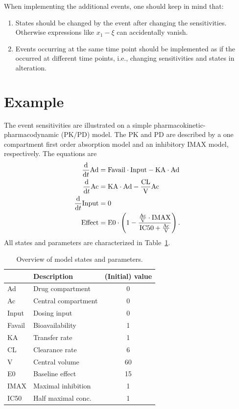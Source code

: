 \documentclass[journal, a4paper]{IEEEtran}
\begin{document}
When implementing the additional events, one should keep in mind that:
\begin{enumerate}
	\item States should be changed by the event after changing the sensitivities. Otherwise expressions like $x_1 - \xi$ can accidentally vanish.
	\item Events occurring at the same time point should be implemented as if the occurred at different time points, i.e., changing sensitivities and states in alteration.
\end{enumerate}


\section{Example}

The event sensitivities are illustrated on a simple pharmacokinetic-pharmacodynamic (PK/PD) model. The PK and PD are described by a one compartment first order absorption model and an inhibitory IMAX model, respectively. The equations are
\begin{align}
  \frac{\rm d}{{\rm d}t}{\rm Ad} &= {\rm Favail}\cdot{\rm Input}-{\rm KA}\cdot{\rm Ad} \label{eq:ODE_1} \\
  \frac{\rm d}{{\rm d}t}{\rm Ac} &= {\rm KA}\cdot{\rm Ad}-\frac{\rm CL}{\rm V}{\rm Ac}\\
  \frac{\rm d}{{\rm d}t}{\rm Input} &= 0 \label{eq:ODE_3} \\
  {\rm Effect} &= {\rm E0}\cdot\left(1-\frac{\frac{\rm Ac}{\rm V}\cdot{\rm IMAX}}{{\rm IC50}+\frac{\rm Ac}{\rm V}}\right).\label{eq:effect}
\end{align}
All states and parameters are characterized in Table~\ref{tab:parameters}.
\begin{table}[hb]
    \caption{Overview of model states and parameters.}
    \centering
    \begin{tabular}{l|l|c}
           & Description & (Initial) value \\
           \hline\hline
        Ad & Drug compartment & 0 \\
        Ac & Central compartment & 0\\
        Input & Dosing input & 0\\
        \hline
        Favail & Bioavailability & 1\\
        KA & Transfer rate & 1\\
        CL & Clearance rate & 6\\
        V & Central volume & 60\\
        E0 & Baseline effect & 15\\
        IMAX & Maximal inhibition & 1\\
        IC50 & Half maximal conc. & 1\\
        \hline
    \end{tabular}
    \label{tab:parameters}
\end{table}
\end{document}
